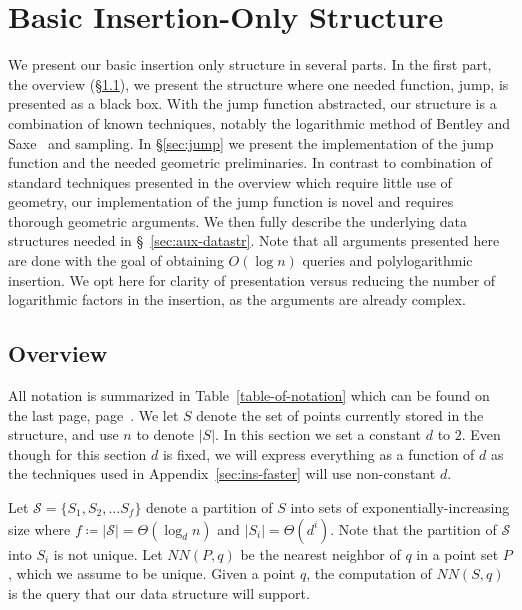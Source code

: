 \documentclass[12pt,a4paper,USenglish,cleveref, autoref, thm-restate]{article}
\newcommand{\NN}{\mathit{NN}}
\newcommand{\mcS}{\mathcal{S}}
\newif\ifsocg
\newcommand{\NN}{\mathit{NN}}
\newcommand{\mcS}{\mathcal{S}}
\newcommand{\NN}{\mathit{NN}}
\newcommand{\mcS}{\mathcal{S}}
\begin{document}


\section{Basic Insertion-Only Structure}
\label{sec:basic-ins}

We present our basic insertion only structure in several parts. In the first part, the overview (\S \ref{sec:framework}), we present the structure where one needed function, jump, is presented as a black box. With the jump function abstracted, our structure is a combination of known techniques, notably
the logarithmic method of Bentley and Saxe~\cite{BentleyS80} and sampling. In \S\ref{sec:jump} we present the implementation of the jump function and the needed geometric preliminaries. In contrast to combination of standard techniques presented in the overview which require little use of geometry, our implementation of the jump function is novel and requires thorough geometric arguments.
We then fully describe the underlying data structures needed in \S~\ref{sec:aux-datastr}. Note that all arguments presented here are done with the goal of obtaining $O(\log n)$ queries and polylogarithmic insertion. We opt here for clarity of presentation versus reducing the number of logarithmic factors in the insertion, as the arguments are already complex. 

\subsection{Overview} \label{sec:framework}

\ifarxiv
All notation is summarized in Table~\ref{table-of-notation} which can be found on the last page, page~\pageref{table-of-notation}.
We let $S$ denote the set of points currently stored in the structure, and use $n$ to denote $|S|$.
In this section we set a constant $d$ to $2$. Even though for this section $d$ is fixed, we will express everything as a function of $d$ as the techniques used in Appendix~\ref{sec:ins-faster} will use non-constant $d$.
\fi
\ifsocg
We let $S$ denote the set of points currently stored in the structure, and use $n$ to denote $|S|$. In this section we set a constant $d$ to $2$. Even though for this section $d$ is fixed, we will express everything as a function of $d$.
\fi


Let $\mcS=\{ S_1, S_2, \ldots S_{f} \}$ denote a partition of $S$ into  sets of exponentially-increasing  size where $f \coloneqq |\mcS|=\Theta(\log_d n)$ and $|S_i|=\Theta(d^i)$. Note that the partition of $\mcS$ into $S_i$ is not unique.
Let $\NN(P,q)$ be the nearest neighbor of $q$ in a point set $P$, which we assume to be unique. Given a point $q$, the computation of $\NN(S,q)$ is the query that our data structure will support.
\end{document}
